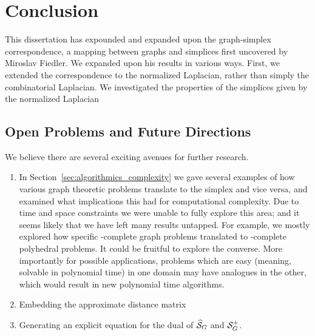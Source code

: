 \chapter{Conclusion}
\label{chap:conclusion}



This dissertation has expounded  and  expanded upon the graph-simplex correspondence, a mapping  between graphs and simplices  first uncovered by Miroslav Fiedler. 
We expanded upon his results in various ways. First, we extended the correspondence to the normalized Laplacian, rather than simply the combinatorial Laplacian. We investigated  the properties of the simplices given by the normalized Laplacian 


\section{Open Problems and Future Directions}
\label{sec:open_problems}

We believe there are several exciting  avenues for further  research. 
\begin{enumerate}
	\item In Section~\ref{sec:algorithmics_complexity} we gave several  examples of how various graph  theoretic problems translate to the simplex and vice  versa, and examined what implications this had for computational complexity. Due to time and space constraints we were unable to fully explore this area; and it seems likely that we have left many  results untapped.  For example, we mostly explored how specific \NP-complete graph problems translated to \NP-complete polyhedral problems. It could be fruitful to explore the converse. More importantly for possible applications, problems which are easy (meaning, solvable in polynomial time) in one domain may have analogues  in the other, which would result in new polynomial  time  algorithms. 
	\item Embedding the approximate distance matrix
	\item Generating an explicit equation for the dual of $\widehat{\mathcal{S}}_G$ and $\mathcal{S}_G^+$. 
\end{enumerate}

